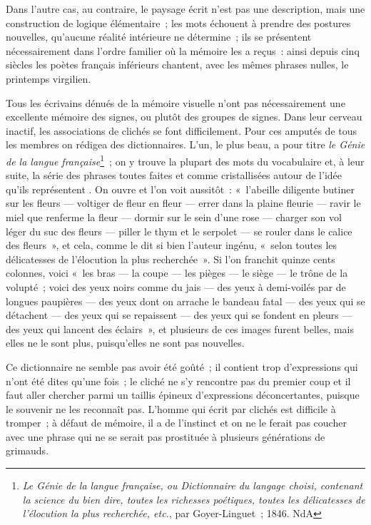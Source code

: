 \documentclass[french,twoside]{book} %
\begin{document}
Dans l’autre cas, au contraire, le paysage écrit n’est pas une description, mais une construction de logique élémentaire ; les mots échouent à prendre des postures nouvelles, qu’aucune réalité intérieure ne détermine ; ils se présentent nécessairement dans l’ordre familier où la mémoire les a reçus : ainsi depuis cinq siècles les poètes français inférieurs chantent, avec les mêmes phrases nulles, le printemps virgilien.\par
Tous les écrivains dénués de la mémoire visuelle n’ont pas nécessairement une excellente mémoire des signes, ou plutôt des groupes de signes. Dans leur cerveau inactif, les associations de clichés se font difficilement. Pour ces amputés de tous les membres on rédigea des dictionnaires. L’un, le plus beau, a pour titre {\itshape le Génie de la langue française}\footnote{ {\itshape Le Génie de la langue française, ou Dictionnaire du langage choisi, contenant la science du bien dire, toutes les richesses poétiques, toutes les délicatesses de l’élocution la plus recherchée, etc.}, par Goyer-Linguet ; 1846. NdA} ; on y trouve la plupart des mots du vocabulaire et, à leur suite, la série des phrases toutes faites et comme cristallisées autour de l’idée qu’ils représentent . On ouvre et l’on voit aussitôt : « l’abeille diligente butiner sur les fleurs — voltiger de fleur en fleur — errer dans la plaine fleurie — ravir le miel que renferme la fleur — dormir sur le sein d’une rose — charger son vol léger du suc des fleurs — piller le thym et le serpolet — se rouler dans le calice des fleurs », et cela, comme le dit si bien l’auteur ingénu, « selon toutes les délicatesses de l’élocution la plus recherchée ». Si l’on franchit quinze cents colonnes, voici « les bras — la coupe — les pièges — le siège — le trône de la volupté ; voici des yeux noirs comme du jais — des yeux à demi-voilés par de longues paupières — des yeux dont on arrache le bandeau fatal — des yeux qui se détachent — des yeux qui se repaissent — des yeux qui se fondent en pleurs — des yeux qui lancent des éclairs », et plusieurs de ces images furent belles, mais elles ne le sont plus, puisqu’elles ne sont pas nouvelles.\par
Ce dictionnaire ne semble pas avoir été goûté ; il contient trop d’expressions qui n’ont été dites qu’une fois ; le cliché ne s’y rencontre pas du premier coup et il faut aller chercher parmi un taillis épineux d’expressions déconcertantes, puisque le souvenir ne les reconnaît pas. L’homme qui écrit par clichés est difficile à tromper ; à défaut de mémoire, il a de l’instinct et on ne le ferait pas coucher avec une phrase qui ne se serait pas prostituée à plusieurs générations de grimauds.\par
\end{document}
